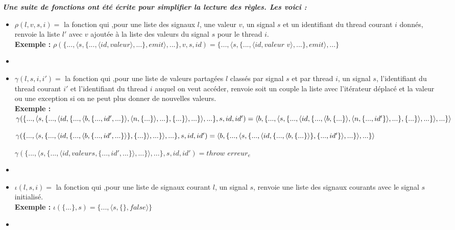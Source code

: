 \documentclass[10pt,a4paper]{report}
\begin{document}
\textbf{\textit{Une suite de fonctions ont été écrite pour simplifier la lecture des règles. Les voici :}}
\smallbreak
\begin{itemize}
\item[] $\rho(l,v,s,i) =$ la fonction qui ,pour une liste des signaux $l$, une valeur $v$, un signal $s$ et un identifiant du thread courant $i$ donnés, renvoie la liste $l'$ avec $v$ ajoutée à la liste des valeurs du signal $s$ pour le thread $i$.
  \\\textbf{Exemple :} $\rho(\{...,\langle s,\{...,\langle id,valeur\rangle,...\},emit\rangle,...\},v,s,id) = \{...,\langle s,\{...,\langle id,valeur$ $v\rangle,...\},emit\rangle,...\}$
\item[] 
  
\item[] $\gamma(l,s,i,i') =$ la fonction qui ,pour une liste de valeurs partagées $l$ classés par signal $s$ et par thread $i$, un signal $s$, l'identifiant du thread courant $i'$ et l'identifiant du thread $i$ auquel on veut accéder, renvoie soit un couple la liste avec l'itérateur déplacé et la valeur ou une exception si on ne peut plus donner de nouvelles valeurs. 
  \\\textbf{Exemple :}
  \\$\gamma(\{...,\langle s,\{...,\langle id,\{...,\langle b,\{...,id',...\}\rangle,\langle n,\{...\}\rangle,...\},\{...\}\rangle,...\}\rangle,...\},s,id,id') = 
  \\\langle b , \{...,\langle s,\{...,\langle id,\{...,\langle b,\{...\}\rangle,\langle n,\{...,id'\}\rangle,...\},\{...\}\rangle,...\}\rangle,...\} \rangle$
  \medbreak
  
  $\gamma(\{...,\langle s,\{...,\langle id,\{...,\langle b,\{...,id',...\}\rangle\},\{...\}\rangle,...\}\rangle,...\},s,id,id') = 
  \\\langle b , \{...,\langle s,\{...,\langle id,\{...,\langle b,\{...\}\rangle\},\{...,id'\}\rangle,...\}\rangle,...\} \rangle$
  \medbreak
  
  $\gamma(\{...,\langle s,\{...,\langle id,valeurs,\{...,id',...\}\rangle,...\}\rangle,...\},s,id,id') = throw$ $erreur_{e}$
\item[]
  
\item[] $\iota(l,s,i) =$ la fonction qui ,pour une liste de signaux courant $l$, un signal $s$, renvoie une liste des signaux courants avec le signal $s$ initialisé.
  \\\textbf{Exemple :} $\iota(\{...\},s) = \{...,\langle s,\{\},false\rangle\}$
\item[]
  

\end{itemize}
\end{document}
